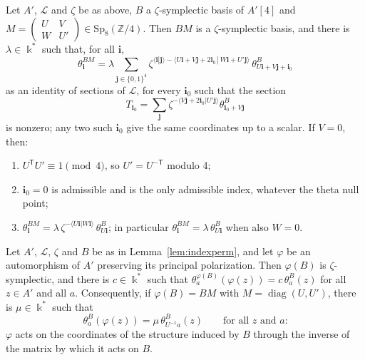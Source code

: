 \documentclass[version=preprint]{iacrcc}
\begin{document}
    \begin{lemma}
        \label{lem:indexperm}
        Let $A'$, $\mathcal L$ and $\zeta$ be as above, $B$ a $\zeta$-symplectic
        basis of $A'[4]$ and $M = \left(\begin{smallmatrix} U & V \\ W & U'
        \end{smallmatrix}\right) \in \mathrm{Sp}_8(\mathbb Z/4)$. Then $BM$ is a
        $\zeta$-symplectic basis, and there is $\lambda \in \Bbbk^*$ such that, for
        all $\mathbf i$,
        \[
        \theta^{BM}_{\mathbf i} = \lambda \sum_{\mathbf j \in \{0,1\}^4}
        \zeta^{\langle \mathbf i | \mathbf j \rangle - \langle U\mathbf i +
            V\mathbf j + 2\mathbf i_0 \,|\, W\mathbf i + U'\mathbf j \rangle}\,
        \theta^B_{U\mathbf i + V\mathbf j + \mathbf i_0}
        \]
        as an identity of sections of $\mathcal L$, for every $\mathbf i_0$ such
        that the section
        \[
        T_{\mathbf i_0} = \sum_{\mathbf j}
        \zeta^{-\langle V\mathbf j + 2\mathbf i_0 | U'\mathbf j\rangle}
        \theta^B_{\mathbf i_0 + V\mathbf j}
        \]
        is nonzero; any two such
        $\mathbf i_0$ give the same coordinates up to a scalar. If $V = 0$, then:
        \begin{enumerate}[label=(\roman*)]
            \item $U^{\mathsf T} U' \equiv 1 \pmod 4$, so $U' = U^{-\mathsf T}$
            modulo 4;
            \item $\mathbf i_0 = 0$ is admissible and is the only admissible
            index, whatever the theta null point;
            \item $\theta^{BM}_{\mathbf i} = \lambda\, \zeta^{-\langle U\mathbf i |
                W\mathbf i\rangle}\, \theta^B_{U\mathbf i}$; in particular
            $\theta^{BM}_{\mathbf i} = \lambda\, \theta^B_{U\mathbf i}$ when also
            $W = 0$.
        \end{enumerate}
    \end{lemma}


    \begin{lemma}[Transport]
        \label{lem:transport}
        Let $A'$, $\mathcal L$, $\zeta$ and $B$ be as in
        Lemma~\ref{lem:indexperm}, and let $\varphi$ be an automorphism of $A'$
        preserving its principal polarization. Then $\varphi(B)$ is
        $\zeta$-symplectic, and there is $c \in \Bbbk^*$ such that
        $\theta^{\varphi(B)}_a(\varphi(z)) = c\, \theta^B_a(z)$ for all $z \in
        A'$ and all $a$. Consequently, if $\varphi(B) = BM$ with $M =
        \operatorname{diag}(U, U')$, there is $\mu \in \Bbbk^*$ such that
        \[
        \theta^B_a(\varphi(z)) = \mu\, \theta^B_{U^{-1} a}(z)
        \qquad\text{for all $z$ and $a$:}
        \]
        $\varphi$ acts on the coordinates of the structure induced by $B$
        through the inverse of the matrix by which it acts on $B$.
    \end{lemma}
\end{document}
